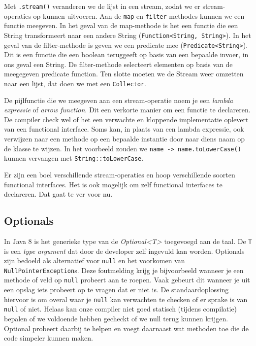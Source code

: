 \documentclass[dutch,a4paper,12pt,doubleside]{book}
\begin{document}
Met \texttt{.stream()} veranderen we de lijst in een stream, zodat we er 
stream-operaties op kunnen uitvoeren.
Aan de \texttt{map} en \texttt{filter} methodes kunnen we een functie meegeven.
In het geval van de map-methode is het een functie die een String transformeert 
naar een andere String (\texttt{Function<String, String>}). In het geval 
van de filter-methode is geven we een predicate mee (\texttt{Predicate<String>}). 
Dit is een functie die een boolean teruggeeft op basis van een bepaalde invoer, in ons geval een String.
De filter-methode selecteert elementen op basis van de meegegeven predicate function.
Ten slotte moeten we de Stream weer omzetten naar een lijst, dat doen we met een \texttt{Collector}.

De pijlfunctie die we meegeven aan een stream-operatie noem je een \textit{lambda expressie} of \textit{arrow function}.
Dit een verkorte manier om een functie te declareren. De compiler check wel of het een verwachte en kloppende
implementatie oplevert van een functional interface.
Soms kan, in plaats van een lambda expressie, ook verwijzen naar een methode op een bepaalde instantie door naar diens naam 
op de klasse te wijzen. In het voorbeeld zouden we \texttt{name -> name.toLowerCase()} kunnen vervangen 
met \texttt{String::toLowerCase}.

Er zijn een boel verschillende stream-operaties en hoop verschillende soorten functional interfaces.
Het is ook mogelijk om zelf functional interfaces te declareren. Dat gaat te ver voor nu.

\subsection{Optionals}
In Java 8 is het generieke type van de \textit{Optional<T>} toegevoegd aan de taal.
De \texttt{T} is een \textit{type argument} dat door de developer zelf ingevuld kan worden.
Optionals zijn bedoeld als alternatief voor \texttt{null} en het voorkomen van 
\texttt{NullPointerException}s. Deze foutmelding krijg je bijvoorbeeld wanneer 
je een methode of veld op \texttt{null} probeert aan te roepen. Vaak gebeurt dit 
wanneer je uit een opslag iets probeert op te vragen dat er niet is. De standaardoplossing
hiervoor is om overal waar je \texttt{null} kan verwachten te checken of 
er sprake is van \texttt{null} of niet. Helaas kan onze compiler niet goed statisch (tijdens compilatie)
bepalen of we voldoende hebben gecheckt of we null terug kunnen krijgen.
Optional probeert daarbij te helpen en voegt daarnaast
wat methoden toe die de code simpeler kunnen maken.
\end{document}
